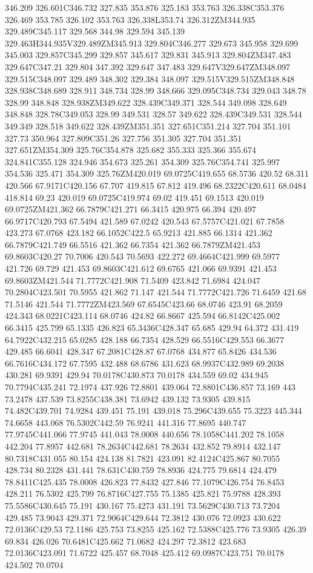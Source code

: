 346.209 326.601C346.732 327.835 353.876 325.183 353.763 326.338C353.376 326.469 353.785 326.102 353.763 326.338L353.74 326.312ZM344.935 329.489C345.117 329.568 344.98 329.594 345.139 329.463H344.935V329.489ZM345.913 329.804C346.277 329.673 345.958 329.699 345.003 329.857C345.299 329.857 345.617 329.831 345.913 329.804ZM347.483 329.647C347.21 329.804 347.392 329.647 347.483 329.647V329.647ZM348.097 329.515C348.097 329.489 348.302 329.384 348.097 329.515V329.515ZM348.848 328.938C348.689 328.911 348.734 328.99 348.666 329.095C348.734 329.043 348.78 328.99 348.848 328.938ZM349.622 328.439C349.371 328.544 349.098 328.649 348.848 328.78C349.053 328.99 349.531 328.57 349.622 328.439C349.531 328.544 349.349 328.518 349.622 328.439ZM351.351 327.651C351.214 327.704 351.101 327.73 350.964 327.809C351.26 327.756 351.305 327.704 351.351 327.651ZM354.309 325.76C354.878 325.682 355.333 325.366 355.674 324.841C355.128 324.946 354.673 325.261 354.309 325.76C354.741 325.997 354.536 325.471 354.309 325.76ZM420.019 69.0725C419.655 68.5736 420.52 68.311 420.566 67.9171C420.156 67.707 419.815 67.812 419.496 68.2322C420.611 68.0484 418.814 69.23 420.019 69.0725C419.974 69.02 419.451 69.1513 420.019 69.0725ZM421.362 66.7879C421.271 66.3415 420.975 66.394 420.497 66.9717C420.793 67.5494 421.589 67.0242 420.543 67.5757C421.021 67.7858 423.273 67.0768 423.182 66.1052C422.5 65.9213 421.885 66.1314 421.362 66.7879C421.749 66.5516 421.362 66.7354 421.362 66.7879ZM421.453 69.8603C420.27 70.7006 420.543 70.5693 422.272 69.4664C421.999 69.5977 421.726 69.729 421.453 69.8603C421.612 69.6765 421.066 69.9391 421.453 69.8603ZM421.544 71.7772C421.908 71.5409 423.842 71.6984 424.047 70.2804C423.501 70.5955 421.862 71.147 421.544 71.7772C421.726 71.6459 421.68 71.5146 421.544 71.7772ZM423.569 67.6545C423.66 68.0746 423.91 68.2059 424.343 68.0221C423.114 68.0746 424.82 66.8667 425.594 66.8142C425.002 66.3415 425.799 65.1335 426.823 65.3436C428.347 65.685 429.94 64.372 431.419 64.7922C432.215 65.0285 428.188 66.7354 428.529 66.5516C429.553 66.3677 429.485 66.6041 428.347 67.2081C428.87 67.0768 434.877 65.8426 434.536 66.7616C434.172 67.7595 432.488 68.6786 431.623 68.9937C432.989 69.2038 430.281 69.9391 429.94 70.0178C430.873 70.0178 434.559 69.02 434.945 70.7794C435.241 72.1974 437.926 72.8801 439.064 72.8801C436.857 73.169 443 73.2478 437.539 73.8255C438.381 73.6942 439.132 73.9305 439.815 74.482C439.701 74.9284 439.451 75.191 439.018 75.296C439.655 75.3223 445.344 74.6658 443.068 76.5302C442.59 76.9241 441.316 77.8695 440.747 77.9745C441.066 77.9745 441.043 78.0008 440.656 78.1058C441.202 78.1058 442.204 77.8957 442.681 78.2634C442.681 78.2634 432.852 79.8914 432.147 80.7318C431.055 80.154 424.138 81.7821 423.091 82.4124C425.867 80.7055 428.734 80.2328 431.441 78.631C430.759 78.8936 424.775 79.6814 424.479 78.8411C425.435 78.0008 426.823 77.8432 427.846 77.1079C426.754 76.8453 428.211 76.5302 425.799 76.8716C427.755 75.1385 425.821 75.9788 428.393 75.5586C430.645 75.191 430.167 75.4273 431.191 73.5629C430.713 73.7204 429.485 73.9043 429.371 72.9064C429.644 72.3812 430.076 72.0923 430.622 72.0136C429.53 72.1186 425.753 73.8255 425.162 72.5388C425.776 73.9305 426.39 69.834 426.026 70.6481C425.662 71.0682 424.297 72.3812 423.683 72.0136C423.091 71.6722 425.457 68.7048 425.412 69.0987C423.751 70.0178 424.502 70.0704 